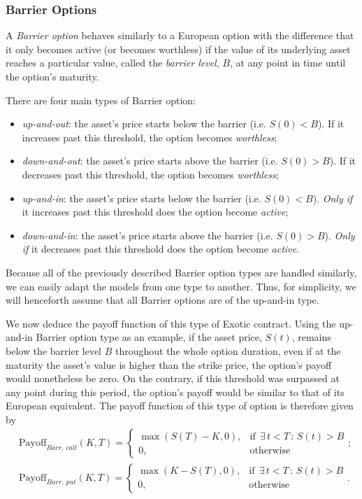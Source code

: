 \subsubsection{Barrier Options}
A \emph{Barrier option} behaves similarly to a European option with the difference that it only becomes active (or becomes worthless) if the value of its underlying asset reaches a particular value, called the \emph{barrier level}, $B$, at any point in time until the option's maturity.

There are four main types of Barrier option:
\begin{itemize}
\item \emph{up-and-out}: the asset's price starts below the barrier (i.e. $S(0)<B$). If it increases past this threshold, the option becomes \emph{worthless};
\item \emph{down-and-out}: the asset's price starts above the barrier (i.e. $S(0)>B$). If it decreases past this threshold, the option becomes \emph{worthless};
\item \emph{up-and-in}: the asset's price starts below the barrier (i.e. $S(0)<B$). \emph{Only if} it increases past this threshold does the option become \emph{active};
\item \emph{down-and-in}: the asset's price starts above the barrier (i.e. $S(0)>B$). \emph{Only if} it decreases past this threshold does the option become \emph{active}.
\end{itemize}

Because all of the previously described Barrier option types are handled similarly, we can easily adapt the models from one type to another. Thus, for simplicity, we will henceforth assume that all Barrier options are of the up-and-in type.

We now deduce the payoff function of this type of Exotic contract. Using the up-and-in Barrier option type as an example, if the asset price, $S(t)$, remains below the barrier level $B$ throughout the whole option duration, even if at the maturity the asset's value is higher than the strike price, the option's payoff would nonetheless be zero. On the contrary, if this threshold was surpassed at any point during this period, the option's payoff would be similar to that of its European equivalent.
The payoff function of this type of option is therefore given by
\begin{equation}\label{barrier}
\begin{split}
&\text{Payoff}_{Barr,\ call}(K,T)=\begin{cases} 
      \max\left(S(T)-K,0\right), & \mathrm{if}\ \ \exists\,t<T\,:\,S(t)>B\\
      0, & \mathrm{otherwise}
   \end{cases};\\
&\text{Payoff}_{Barr,\ put}(K,T)=\begin{cases} 
      \max\left(K-S(T),0\right), & \mathrm{if}\ \ \exists\,t<T\,:\,S(t)>B\\
      0, & \mathrm{otherwise}
   \end{cases}.
\end{split}
\end{equation}


